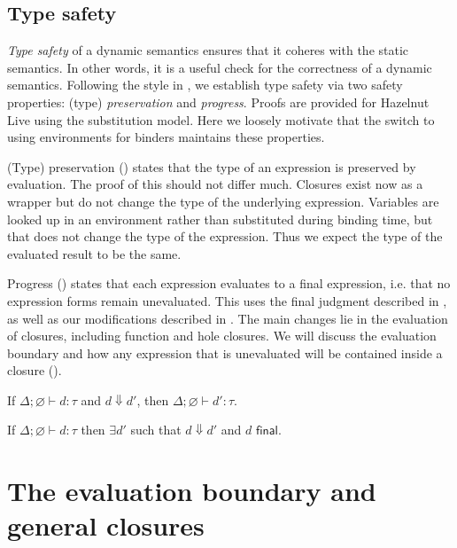 \subsection{Type safety}
\label{sec:evalenv-metatheory}

\textit{Type safety} of a dynamic semantics ensures that it coheres with the static semantics. In other words, it is a useful check for the correctness of a dynamic semantics. Following the style in , we establish type safety via two safety properties: (type) \textit{preservation} and \textit{progress}. Proofs are provided for Hazelnut Live using the substitution model. Here we loosely motivate that the switch to using environments for binders maintains these properties.

(Type) preservation () states that the type of an expression is preserved by evaluation. The proof of this should not differ much. Closures exist now as a wrapper but do not change the type of the underlying expression. Variables are looked up in an environment rather than substituted during binding time, but that does not change the type of the expression. Thus we expect the type of the evaluated result to be the same.

Progress () states that each expression evaluates to a final expression, i.e. that no expression forms remain unevaluated. This uses the \textsf{final} judgment described in , as well as our modifications described in . The main changes lie in the evaluation of closures, including function and hole closures. We will discuss the evaluation boundary and how any expression that is unevaluated will be contained inside a closure ().

\begin{theorem}[Preservation]
  If $\Delta;\varnothing\vdash d:\tau$ and $d\Downarrow d'$, then $\Delta;\varnothing\vdash d':\tau$.
  \label{thm:preservation}
\end{theorem}

\begin{theorem}[Progress]
  If $\Delta;\varnothing\vdash d:\tau$ then $\exists d'$ such that $d\Downarrow d'$ and $d\textsf{ final}$.
  \label{thm:progress}
\end{theorem}

\section{The evaluation boundary and general closures}
\label{sec:generalized-closures-eval-boundary}

